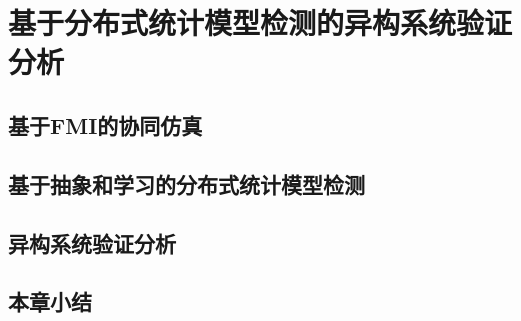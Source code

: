 \chapter{基于分布式统计模型检测的异构系统验证分析}
\label{ch4}

\section{基于FMI的协同仿真}
\section{基于抽象和学习的分布式统计模型检测}
\section{异构系统验证分析}

\section{本章小结}

